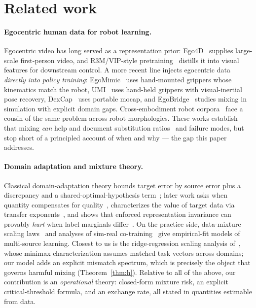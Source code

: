 \section{Related work}
\label{sec:related}

\paragraph{Egocentric human data for robot learning.}
Egocentric video has long served as a representation prior: Ego4D~\cite{grauman2022ego4d} supplies large-scale first-person video, and R3M/VIP-style pretraining~\cite{nair2022r3m,ma2022vip} distills it into visual features for downstream control.
A more recent line injects egocentric data \emph{directly into policy training}: EgoMimic~\cite{kareer2024egomimic} uses hand-mounted grippers whose kinematics match the robot, UMI~\cite{chi2024universal} uses hand-held grippers with visual-inertial pose recovery, DexCap~\cite{wang2024dexcap} uses portable mocap, and EgoBridge~\cite{egobridge2025} studies mixing in simulation with explicit domain gaps.
Cross-embodiment robot corpora~\cite{openx2024} face a cousin of the same problem across robot morphologies.
These works establish that mixing \emph{can} help and document substitution ratios~\cite{zevaego2025} and failure modes, but stop short of a principled account of when and why --- the gap this paper addresses.

\paragraph{Domain adaptation and mixture theory.}
Classical domain-adaptation theory bounds target error by source error plus a discrepancy and a shared-optimal-hypothesis term~\cite{bendavid2010theory}; later work asks when quantity compensates for quality~\cite{bendavid2014quantity}, characterizes the value of target data via transfer exponents~\cite{hanneke2019value}, and shows that enforced representation invariance can provably \emph{hurt} when label marginals differ~\cite{zhao2019learning}.
On the practice side, data-mixture scaling laws~\cite{wu2026mixture} and analyses of sim-real co-training~\cite{lei2026simreal} give empirical-fit models of multi-source learning.
Closest to us is the ridge-regression scaling analysis of~\cite{wu2026mixture}, whose minimax characterization assumes matched task vectors across domains; our model adds an explicit mismatch spectrum, which is precisely the object that governs harmful mixing (Theorem~\ref{thm:h}).
Relative to all of the above, our contribution is an \emph{operational} theory: closed-form mixture risk, an explicit critical-threshold formula, and an exchange rate, all stated in quantities estimable from data.


